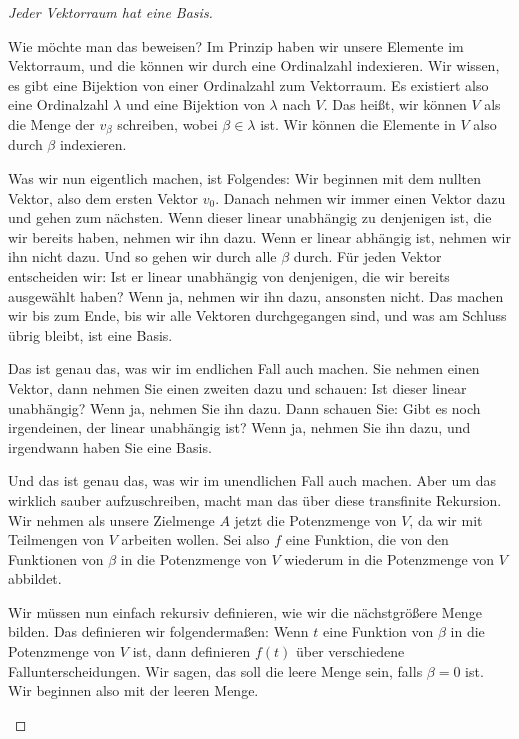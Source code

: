 \begin{proof}[Jeder Vektorraum hat eine Basis]
\begin{spoken-clean}[00:36:55 - 00:38:40]
Wie möchte man das beweisen? Im Prinzip haben wir unsere Elemente im Vektorraum, und die können wir durch eine Ordinalzahl indexieren. Wir wissen, es gibt eine Bijektion von einer Ordinalzahl zum Vektorraum. Es existiert also eine Ordinalzahl $\lambda$ und eine Bijektion von $\lambda$ nach $V$. Das heißt, wir können $V$ als die Menge der $v_\beta$ schreiben, wobei $\beta \in \lambda$ ist. Wir können die Elemente in $V$ also durch $\beta$ indexieren.

Was wir nun eigentlich machen, ist Folgendes: Wir beginnen mit dem nullten Vektor, also dem ersten Vektor $v_0$. Danach nehmen wir immer einen Vektor dazu und gehen zum nächsten. Wenn dieser linear unabhängig zu denjenigen ist, die wir bereits haben, nehmen wir ihn dazu. Wenn er linear abhängig ist, nehmen wir ihn nicht dazu. Und so gehen wir durch alle $\beta$ durch. Für jeden Vektor entscheiden wir: Ist er linear unabhängig von denjenigen, die wir bereits ausgewählt haben? Wenn ja, nehmen wir ihn dazu, ansonsten nicht. Das machen wir bis zum Ende, bis wir alle Vektoren durchgegangen sind, und was am Schluss übrig bleibt, ist eine Basis.

Das ist genau das, was wir im endlichen Fall auch machen. Sie nehmen einen Vektor, dann nehmen Sie einen zweiten dazu und schauen: Ist dieser linear unabhängig? Wenn ja, nehmen Sie ihn dazu. Dann schauen Sie: Gibt es noch irgendeinen, der linear unabhängig ist? Wenn ja, nehmen Sie ihn dazu, und irgendwann haben Sie eine Basis.
\end{spoken-clean}

\begin{spoken-clean}[00:38:40 - 00:40:40]
Und das ist genau das, was wir im unendlichen Fall auch machen. Aber um das wirklich sauber aufzuschreiben, macht man das über diese transfinite Rekursion. Wir nehmen als unsere Zielmenge $A$ jetzt die Potenzmenge von $V$, da wir mit Teilmengen von $V$ arbeiten wollen. Sei also $f$ eine Funktion, die von den Funktionen von $\beta$ in die Potenzmenge von $V$ wiederum in die Potenzmenge von $V$ abbildet.
\end{spoken-clean}

\begin{spoken-clean}[00:40:40 - 00:42:40]
Wir müssen nun einfach rekursiv definieren, wie wir die nächstgrößere Menge bilden. Das definieren wir folgendermaßen: Wenn $t$ eine Funktion von $\beta$ in die Potenzmenge von $V$ ist, dann definieren $f(t)$ über verschiedene Fallunterscheidungen. Wir sagen, das soll die leere Menge sein, falls $\beta = 0$ ist. Wir beginnen also mit der leeren Menge.
\end{spoken-clean}


\end{proof}
